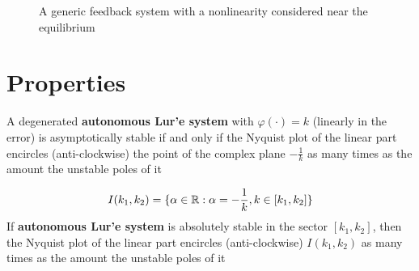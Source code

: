 \begin{figure}[htb]
    \centering
    \caption{A generic feedback system with a nonlinearity considered near the equilibrium}
    \label{fig:generic-feedback-system-equilibrium}
\end{figure}

\section{Properties}

\begin{theorem}\label{thm:nyquist}
A degenerated \textbf{autonomous Lur'e system} with $\varphi(\cdot) = k$ (linearly in the error) is asymptotically stable if and only if the Nyquist plot of the linear part encircles (anti-clockwise) the point of the complex plane $-\frac{1}{k}$ as many times as the amount the unstable poles of it
\end{theorem}

\begin{theorem}\label{thm:lure-nyquist}
    \[
        I(k_1,k_2) = \{\alpha \in \mathbb{R} : \alpha = -\frac{1}{k}, k \in [k_1,k_2]\}
    \]
    If \textbf{autonomous Lur'e system} is absolutely stable in the sector $[k_1,k_2]$, then the Nyquist plot of the linear part encircles (anti-clockwise) $I(k_1,k_2)$ as many times as the amount the unstable poles of it
\end{theorem}

